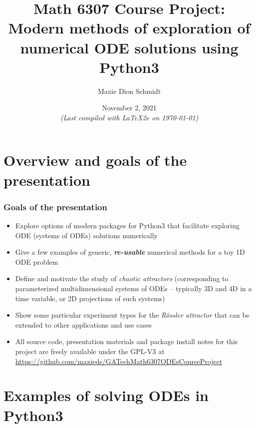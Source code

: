 \documentclass[usenames,svgnames,dvipsnames,10pt]{beamer}
\title[Math 6307 Course Project]{
     Math 6307 Course Project: \\ Modern methods of exploration of numerical ODE solutions using Python3 
}
\author{Maxie Dion Schmidt} %
\institute[GA Tech] 
{
Georgia Institute of Technology \\ 
School of Mathematics \\ %
\medskip
\textit{maxieds@gmail.com} \\ 
\textit{mschmidt34@gatech.edu} \\ 
\medskip 
\url{http://people.math.gatech.edu/~mschmidt34/} \\ 
\url{https://github.com/maxieds/GATechMath6307ODEsCourseProject}
}
\date[November 2, 2021]{November 2, 2021 \\ {\small{\it (Last compiled with \LaTeX2e on \today)}}} %
\begin{document}
\begin{frame}
\titlepage %
\end{frame} 



\section{Overview and goals of the presentation} 

\begin{frame}
     \frametitle{Goals of the presentation}

\begin{itemize} 

     \item Explore options of modern packages for Python3 that facilitate exploring ODE (systems of ODEs) solutions numerically 
     \item Give a few examples of generic, \emph{\textbf{re-usable}} numerical methods for a toy 1D ODE problem
     \item Define and motivate the study of \emph{chaotic attractors} (corresponding to parameterized multidimensional systems of ODEs -- 
           typically 3D and 4D in a time variable, or 2D projections of such systems) 
     \item Show some particular experiment types for the \emph{R\"ossler attractor} that can be extended to other applications and use cases
     \item All source code, presentation materials and package install notes 
           for this project are freely available under the GPL-V3 at \\ 
           {\small{\url{https://github.com/maxieds/GATechMath6307ODEsCourseProject}}}

\end{itemize} 

\end{frame}

\section{Examples of solving ODEs in Python3}
\end{document}
